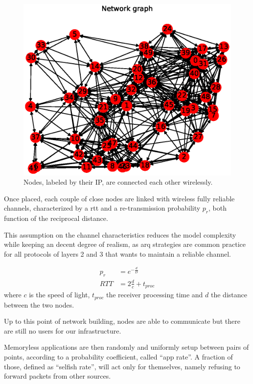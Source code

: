 \documentclass[conference]{IEEEtran}
\begin{document}
\begin{figure}[h]
  \centering
  \includegraphics[width=\linewidth]{figures/example_graph}
  \caption{Nodes, labeled by their IP, are connected each other wirelessly.}
  \label{fig:nodes}
\end{figure}

Once placed, each couple of close nodes are linked with wireless fully reliable channels, characterized by a \gls{rtt} and a re-transmission probability $p_r$, both function of the reciprocal distance.

This assumption on the channel characteristics reduces the model complexity while keeping an decent degree of realism, as \gls{arq} strategies are common practice for all protocols of layers 2 and 3 that wants to maintain a reliable channel.

\begin{equation}
  \begin{split}
    p_r & = e^{-\frac{d}{D}} \\
    RTT &= 2 \frac{d}{c} + t_{proc}
  \end{split}
\end{equation}
where $c$ is the speed of light, $t_{proc}$ the receiver processing time and $d$ the distance between the two nodes.
\smallskip

Up to this point of network building, nodes are able to communicate but there are still no users for our infrastructure.

Memoryless applications are then randomly and uniformly setup between pairs of points, according to a probability coefficient, called ``app rate''. A fraction of those, defined as ``selfish rate'', will act only for themselves, namely refusing to forward packets from other sources.
\end{document}
